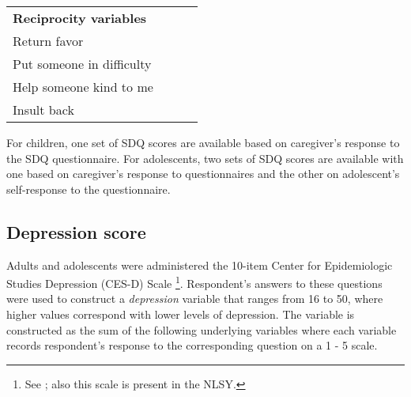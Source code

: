 \begin{table}[H]
\begin{center}
{\begin{threeparttable}
\begin{tabular}{L{5.5cm}C{2cm} C{2cm} C{2cm}}
		\textbf{Reciprocity variables}							&									&							&								\\
		\quad \quad Return favor								&									& \checkmark				& \checkmark					 \\
		\quad \quad Put someone in difficulty					&									& \checkmark				& \checkmark					 \\	
		\quad \quad Help someone kind to me					&									& \checkmark				& \checkmark					 \\
		\quad \quad Insult back								&									& \checkmark				& \checkmark					 \\

		
		\hline
		\end{tabular}

		\begin{tablenotes}
		\singlespace
		\footnotesize{
			\item [1] For children, one set of SDQ scores are available based on caregiver's response to the SDQ questionnaire. For adolescents, two sets of SDQ scores are available with one based on caregiver's response to questionnaires and the other on  adolescent's self-response to the questionnaire.  
		}
		\end{tablenotes}
	\end{threeparttable}
	}
	\end{center}
\end{table}
\setcounter{footnote}{0}

\subsection{Depression score}
Adults and adolescents were administered the 10-item Center for Epidemiologic Studies Depression (CES-D) Scale \footnote{See \cite{Radloff_1977_APM}; also this scale is present in the NLSY.}. Respondent's answers to these questions were used to construct a \textit{depression} variable that ranges from 16 to 50, where higher values correspond with lower levels of depression. The variable is constructed as the sum of the following underlying variables where each variable records respondent's response to the corresponding question on a 1 - 5 scale. \\

